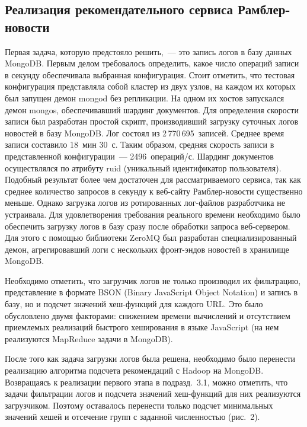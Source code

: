 \begin{multicols}{2}
\section{Реализация рекомендательного сервиса Рамблер-новости}
   
   Первая задача, которую предстояло решить,~--- это запись логов в базу 
данных MongoDB. Первым делом требовалось определить, какое число 
операций записи в секунду обеспечивала выбранная конфигурация. Стоит 
отметить, что тестовая конфигурация представляла собой кластер из двух 
узлов, на каждом их которых был запущен демон {\sf mongod} без репликации. На 
одном их хостов запускался демон mongos, обеспечивавший шардинг 
документов. Для определения скорости записи был разработан простой скрипт, 
производивший загрузку суточных логов новостей в базу MongoDB. Лог 
состоял из 2\,770\,695~записей. Среднее время записи составило 18~мин 
30~с. Таким образом, средняя скорость записи в представленной 
конфигурации~--- 2496~операций/с. Шардинг документов осуществлялся по 
атрибуту {\sf ruid} (уникальный идентификатор пользователя). Подобный результат 
более чем достаточен для рассматриваемого сервиса, так как среднее 
количество запросов в секунду к веб-сай\-ту Рамб\-лер-но\-вости существенно 
меньше. Однако загрузка логов из ротированных лог-фай\-лов разработчика не 
устраивала. Для удовлетворения требования реального времени необходимо 
было обеспечить загрузку логов в базу сразу после обработки запроса 
   веб-сер\-ве\-ром. Для этого с помощью библиотеки ZeroMQ был разработан 
специализированный демон, агрегировавший логи с нескольких фронт-эндов 
новостей в хранилище MongoDB. 

Необходимо отметить, что загрузчик логов не 
только производил их фильтрацию, представление в формате BSON (Binary JavaScript
Object Notation) и запись в 
базу, но и подсчет значений хеш-функ\-ций для каждого URL. Это было 
обусловлено двумя факторами: снижением времени вычислений и отсутствием 
приемлемых реализаций быстрого хеширования в языке JavaScript (на нем 
реализуются MapReduce задачи в MongoDB).
   
   После того как задача загрузки логов была решена, необходимо было 
перенести реализацию алгоритма подсчета рекомендаций с Hadoop на 
MongoDB. Возвращаясь к реализации первого этапа в под\-разд.~3.1, можно 
отметить, что задачи фильтрации логов и подсчета значений хеш-функ\-ций для 
них реализуются загрузчиком. Поэтому оставалось перенести только подсчет 
минимальных значений хешей и отсечение групп с заданной численностью 
(рис.~2).


\end{multicols}
